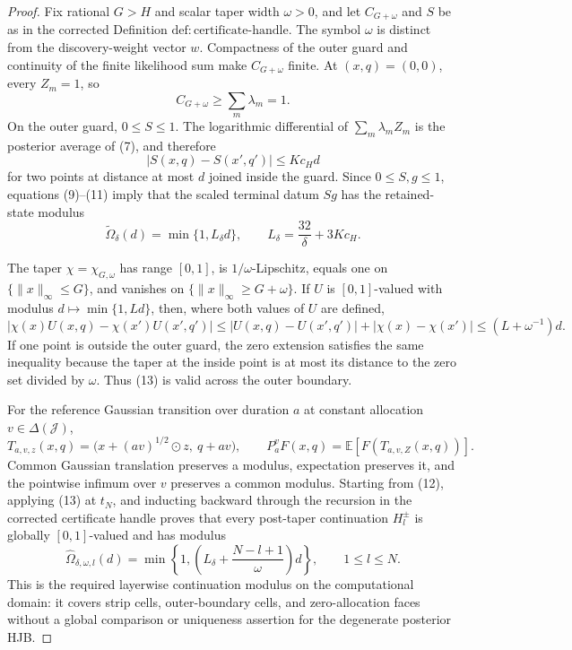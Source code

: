 \documentclass{article}
\begin{document}
\begin{proof}
Fix rational \(G>H\) and scalar taper width \(\omega>0\), and let \(C_{G+\omega}\) and \(S\) be as in the corrected Definition \(\mathrm{def{:}certificate\text{-}handle}\).  The symbol \(\omega\) is distinct from the discovery-weight vector \(w\).  Compactness of the outer guard and continuity of the finite likelihood sum make \(C_{G+\omega}\) finite.  At \((x,q)=(0,0)\), every \(Z_m=1\), so
\[
 C_{G+\omega}\geq\sum_m\lambda_m=1.
 \tag{10}
\]
On the outer guard, \(0\leq S\leq1\).  The logarithmic differential of \(\sum_m\lambda_mZ_m\) is the posterior average of (7), and therefore
\[
 |S(x,q)-S(x',q')|\leq Kc_Hd
 \tag{11}
\]
for two points at distance at most \(d\) joined inside the guard.  Since \(0\leq S,g\leq1\), equations (9)--(11) imply that the scaled terminal datum \(Sg\) has the retained-state modulus
\[
 \widetilde\Omega_\delta(d)=\min\{1,L_\delta d\},
 \qquad L_\delta=\frac{32}{\delta}+3Kc_H.
 \tag{12}
\]

The taper \(\chi=\chi_{G,\omega}\) has range \([0,1]\), is \(1/\omega\)-Lipschitz, equals one on \(\{\|x\|_\infty\leq G\}\), and vanishes on \(\{\|x\|_\infty\geq G+\omega\}\).  If \(U\) is \([0,1]\)-valued with modulus \(d\mapsto\min\{1,Ld\}\), then, where both values of \(U\) are defined,
\[
 |\chi(x)U(x,q)-\chi(x')U(x',q')|
 \leq |U(x,q)-U(x',q')|+|\chi(x)-\chi(x')|
 \leq(L+\omega^{-1})d.
 \tag{13}
\]
If one point is outside the outer guard, the zero extension satisfies the same inequality because the taper at the inside point is at most its distance to the zero set divided by \(\omega\).  Thus (13) is valid across the outer boundary.

For the reference Gaussian transition over duration \(a\) at constant allocation \(v\in\Delta(\mathcal J)\),
\[
 T_{a,v,z}(x,q)=
 \bigl(x+(av)^{1/2}\mathbin\odot z,\ q+av\bigr),
 \qquad P_a^vF(x,q)=\mathbb E[F(T_{a,v,Z}(x,q))].
 \tag{14}
\]
Common Gaussian translation preserves a modulus, expectation preserves it, and the pointwise infimum over \(v\) preserves a common modulus.  Starting from (12), applying (13) at \(t_N\), and inducting backward through the recursion in the corrected certificate handle proves that every post-taper continuation \(H_l^\pm\) is globally \([0,1]\)-valued and has modulus
\[
 \widehat\Omega_{\delta,\omega,l}(d)
 =\min\!\left\{1,\left(L_\delta+\frac{N-l+1}{\omega}\right)d\right\},
 \qquad 1\leq l\leq N.
 \tag{15}
\]
This is the required layerwise continuation modulus on the computational domain: it covers strip cells, outer-boundary cells, and zero-allocation faces without a global comparison or uniqueness assertion for the degenerate posterior HJB.


\end{proof}
\end{document}
